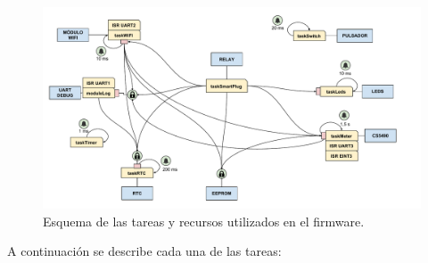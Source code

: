 \begin{figure}[h]
	\centering
	\includegraphics[width=16cm]{./Figures/3_2_1_firmware_esquema_tareas.pdf}
	\caption{Esquema de las tareas y recursos utilizados en el firmware.}
	\label{fig:firmware_esquema_tareas}
\end{figure}

A continuación se describe cada una de las tareas:

